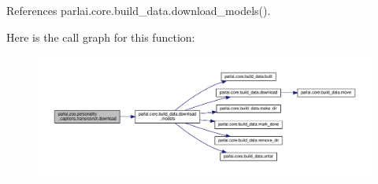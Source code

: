 References parlai.\+core.\+build\+\_\+data.\+download\+\_\+models().

Here is the call graph for this function\+:
\nopagebreak
\begin{figure}[H]
\begin{center}
\leavevmode
\includegraphics[width=350pt]{namespaceparlai_1_1zoo_1_1personality__captions_1_1transresnet_a3bc7fd4d2fb757f3481c3dab3355ef12_cgraph}
\end{center}
\end{figure}
